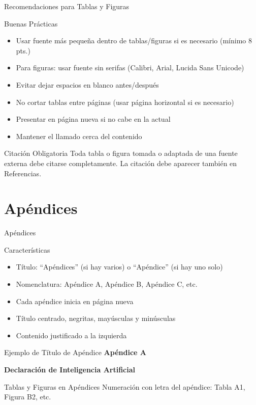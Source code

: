 \documentclass[spanish,aspectratio=169]{beamer}
\begin{document}
\begin{frame}{Recomendaciones para Tablas y Figuras}
	\begin{block}{Buenas Prácticas}
		\begin{itemize}
			\item Usar fuente más pequeña dentro de tablas/figuras si es necesario (mínimo 8 pts.)
			\item Para figuras: usar fuente sin serifas (Calibri, Arial, Lucida Sans Unicode)
			\item Evitar dejar espacios en blanco antes/después
			\item No cortar tablas entre páginas (usar página horizontal si es necesario)
			\item Presentar en página nueva si no cabe en la actual
			\item Mantener el llamado cerca del contenido
		\end{itemize}
	\end{block}
	
	\begin{alertblock}{Citación Obligatoria}
		Toda tabla o figura tomada o adaptada de una fuente externa debe citarse completamente. La citación debe aparecer también en Referencias.
	\end{alertblock}
\end{frame}

\section{Apéndices}

\begin{frame}{Apéndices}
	\begin{block}{Características}
		\begin{itemize}
			\item Título: ``Apéndices'' (si hay varios) o ``Apéndice'' (si hay uno solo)
			\item Nomenclatura: Apéndice A, Apéndice B, Apéndice C, etc.
			\item Cada apéndice inicia en página nueva
			\item Título centrado, negritas, mayúsculas y minúsculas
			\item Contenido justificado a la izquierda
		\end{itemize}
	\end{block}
	
	\begin{exampleblock}{Ejemplo de Título de Apéndice}
		\centering
		\textbf{Apéndice A}
		
		\textbf{Declaración de Inteligencia Artificial}
	\end{exampleblock}
	
	\begin{alertblock}{Tablas y Figuras en Apéndices}
		Numeración con letra del apéndice: Tabla A1, Figura B2, etc.
	\end{alertblock}
\end{frame}
\end{document}
